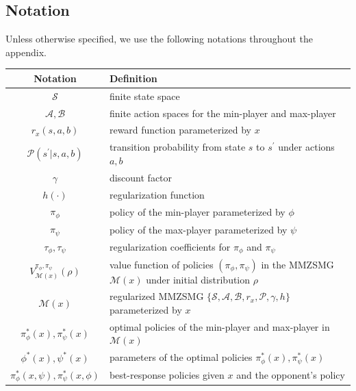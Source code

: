 \documentclass{article}
\theoremstyle{plain}
\theoremstyle{definition}
\theoremstyle{remark}
\def\cA{\mathcal A}
\def\cB{\mathcal B}
\def\cM{\mathcal M}
\def\cP{\mathcal P}
\def\cS{\mathcal S}
\begin{document}
\subsection{Notation}
\label{table: notation-table}
Unless otherwise specified, we use the following notations throughout the appendix.
\begin{table}[!htbp]
  \begin{center}
    \begin{small}
        \begin{threeparttable}
            \begin{tabular}{cl}
            \toprule
            Notation & Definition \\
            \midrule
            $\cS$ & finite state space  \\
            $\cA,\cB$ & finite action spaces for the min-player and max-player \\
            $r_x(s,a,b)$ & reward function parameterized by $x$ \\
            $\cP(s^\prime|s,a,b)$ & transition probability from state $s$ to $s^\prime$ under actions $a,b$ \\
            $\gamma$ & discount factor \\
            $h(\cdot)$ & regularization function \\
            $\pi_\phi$ & policy of the min-player parameterized by $\phi$ \\
            $\pi_\psi$ & policy of the max-player parameterized by $\psi$ \\
            $\tau_\phi,\tau_\psi$ & regularization coefficients for $\pi_\phi$ and $\pi_\psi$ \\
            $V^{\pi_\phi,\pi_\psi}_{\cM(x)}(\rho)$ & value function of policies $(\pi_\phi,\pi_\psi)$ in the MMZSMG $\cM(x)$ under initial distribution $\rho$ \\
            $\cM(x)$ & regularized MMZSMG $\{\cS,\cA,\cB,r_x,\cP,\gamma,h\}$  parameterized by $x$ \\
            $\pi^*_\phi(x),\pi^*_\psi(x)$ & optimal policies of the min-player and max-player in $\cM(x)$ \\
            $\phi^*(x),\psi^*(x)$ & parameters of the optimal policies $\pi^*_\phi(x),\pi^*_\psi(x)$ \\
            $\pi^*_\phi(x,\psi),\pi^*_\psi(x,\phi)$ &  best-response policies given $x$ and the opponent's policy \\

\end{tabular}
\end{threeparttable}
\end{small}
\end{center}
\end{table}
\end{document}
